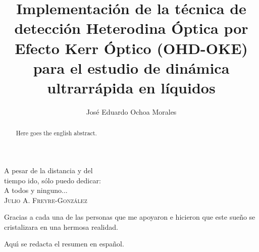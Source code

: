 \documentclass[11pt,spanish]{report}
\begin{document}
\title{Implementaci\'on de la t\'ecnica de detecci\'on Heterodina \'Optica por Efecto Kerr \'Optico (OHD-OKE) para el estudio de din\'amica ultrarr\'apida en l\'iquidos}
\author{Jos\'e Eduardo Ochoa Morales}


\maketitle

\begin{dedication}
A pesar de la distancia y del\\
tiempo ido, s\'{o}lo puedo dedicar:\\
A todos y ninguno...\\
\textsc{Julio A. Freyre-Gonz\'{a}lez}
\end{dedication}

\begin{acknowledgements}
Gracias a cada una de las personas que me apoyaron e hicieron que
este sue\~{n}o se cristalizara en una hermosa realidad.
\end{acknowledgements}

\tableofcontents
\clearpage




\begin{resumen}
Aqu\'{\i} se redacta el resumen en espa\~{n}ol.
\end{resumen}

\begin{abstract}
Here goes the english abstract.
\end{abstract}


\end{document}
